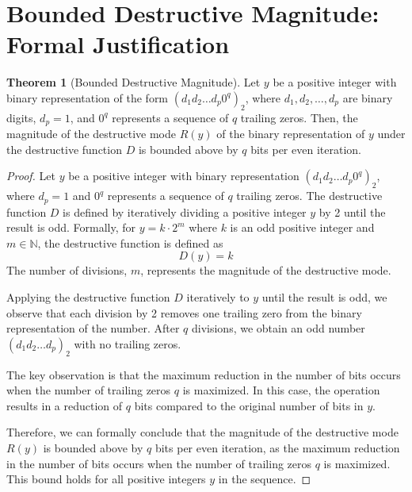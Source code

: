 \documentclass{article}
\theoremstyle{definition}
\newtheorem{theorem}{Theorem}
\begin{document}
\section{Bounded Destructive Magnitude: Formal Justification}

\begin{theorem}[Bounded Destructive Magnitude]
Let \( y \) be a positive integer with binary representation of the form \( (d_1 d_2 \ldots d_p 0^q)_2 \), where \( d_1, d_2, \ldots, d_p \) are binary digits, \( d_p = 1 \), and \( 0^q \) represents a sequence of \( q \) trailing zeros. Then, the magnitude of the destructive mode \( R(y) \) of the binary representation of \( y \) under the destructive function \( D \) is bounded above by \( q \) bits per even iteration.
\end{theorem}

\begin{proof}
Let \( y \) be a positive integer with binary representation \( (d_1 d_2 \ldots d_p 0^q)_2 \), where \( d_p = 1 \) and \( 0^q \) represents a sequence of \( q \) trailing zeros. The destructive function \( D \) is defined by iteratively dividing a positive integer \( y \) by 2 until the result is odd. Formally, for \( y = k \cdot 2^m \) where \( k \) is an odd positive integer and \( m \in \mathbb{N} \), the destructive function is defined as
\[ D(y) = k \]
The number of divisions, \( m \), represents the magnitude of the destructive mode.

Applying the destructive function \( D \) iteratively to \( y \) until the result is odd, we observe that each division by 2 removes one trailing zero from the binary representation of the number. After \( q \) divisions, we obtain an odd number \( (d_1 d_2 \ldots d_p)_2 \) with no trailing zeros.

The key observation is that the maximum reduction in the number of bits occurs when the number of trailing zeros \( q \) is maximized. In this case, the operation results in a reduction of \( q \) bits compared to the original number of bits in \( y \).

Therefore, we can formally conclude that the magnitude of the destructive mode \( R(y) \) is bounded above by \( q \) bits per even iteration, as the maximum reduction in the number of bits occurs when the number of trailing zeros \( q \) is maximized. This bound holds for all positive integers \( y \) in the sequence.
\end{proof}
\end{document}
